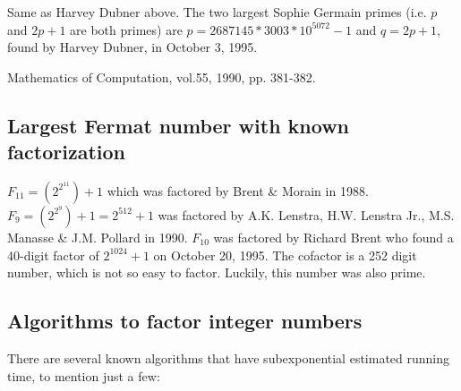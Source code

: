 %
 
Same as Harvey Dubner above.  The two largest Sophie Germain primes
(i.e. $p$ and $2p+1$ are both primes) are $p=2687145 * 3003 * 10^{5072}
- 1$ and $q=2p + 1$, found by Harvey Dubner, in October 3, 1995.


\Ref

  { Mathematics of
  Computation,}{ vol.55, 1990, pp. 381-382. }


\subsection{Largest Fermat number with known factorization}

$F_{11} = (2^{2^{11}}) + 1$ which was factored by Brent \& Morain in
1988. $F_9 = (2^{2^9}) + 1 = 2^{512} + 1$ was factored by A.K. Lenstra,
H.W. Lenstra Jr., M.S. Manasse \& J.M. Pollard in
1990. %
$F_{10}$ was factored by Richard Brent who found a 40-digit factor of
$2^{1024} + 1$ on October 20, 1995. The cofactor is a 252 digit number,
which is not so easy to factor. Luckily, this number was also prime.

\subsection{Algorithms to factor integer numbers}

There are several known algorithms that have subexponential estimated
running time, to mention just a few:

